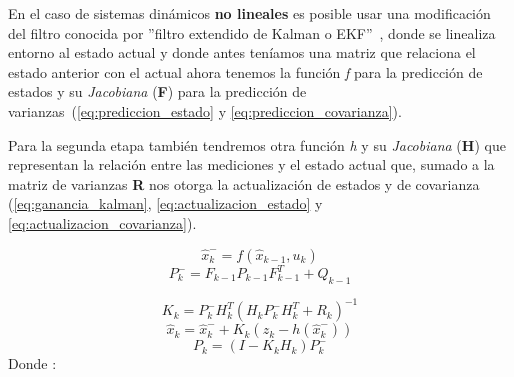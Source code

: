 En el caso de sistemas dinámicos \textbf{no lineales} es posible usar una modificación del filtro conocida por ''filtro extendido de Kalman o EKF''~\cite{rigatos2007extended}, donde 
se linealiza entorno al estado actual y donde antes teníamos una matriz que relaciona el estado anterior con el actual ahora tenemos la función \textit{f} 
para la predicción de estados y su \textit{Jacobiana} (\textbf{F}) para la predicción de varianzas~(\ref{eq:prediccion_estado} y \ref{eq:prediccion_covarianza}).

Para la segunda etapa también tendremos otra función \textit{h} y su \textit{Jacobiana} (\textbf{H}) que representan la relación entre 
las mediciones y el estado actual que, sumado a la matriz de varianzas \textbf{R} nos otorga la actualización de estados y de covarianza (\ref{eq:ganancia_kalman}, \ref{eq:actualizacion_estado} y \ref{eq:actualizacion_covarianza}). 

\begin{equation}\label{eq:prediccion_estado}
\hat{x}_k^- = f(\hat{x}_{k-1}, u_k) 
\end{equation}
\begin{equation}\label{eq:prediccion_covarianza}
P_k^- = F_{k-1}P_{k-1}F_{k-1}^T + Q_{k-1}
\end{equation}

\begin{equation}\label{eq:ganancia_kalman}
K_k = P_k^-H_k^T(H_kP_k^-H_k^T + R_k)^{-1}
\end{equation}
\begin{equation}\label{eq:actualizacion_estado}
\hat{x}_k = \hat{x}_k^- + K_k(z_k - h(\hat{x}_k^-))
\end{equation}
\begin{equation}\label{eq:actualizacion_covarianza}
P_k = (I - K_kH_k)P_k^-
\end{equation}
Donde :

